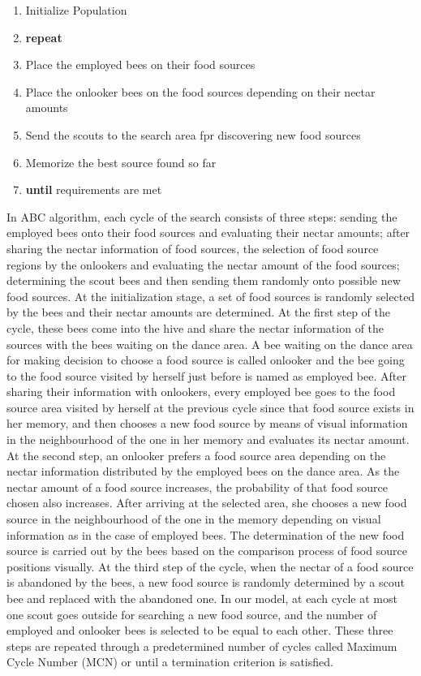 \documentclass[pdftex,11pt]{article}
\begin{document}
\begin{enumerate}
\item Initialize Population
\item \textbf{repeat}
\item Place the employed bees on their food sources
\item Place the onlooker bees on the food sources depending on their nectar amounts
\item Send the scouts to the search area fpr discovering new food sources
\item Memorize the best source found so far
\item \textbf{until} requirements are met
\end{enumerate}
In ABC algorithm, each cycle of the search consists of three steps: sending the employed bees onto their food sources and evaluating their nectar amounts; after sharing the nectar information of food sources, the selection of food source regions by the onlookers and evaluating the nectar amount of the food sources; determining the scout bees and then sending them randomly onto possible new food sources. At the initialization stage, a set of food sources is randomly selected by the bees and their nectar amounts are determined. At the first step of the cycle, these bees come into the hive and share the nectar information of the sources with the bees waiting on the dance area. A bee waiting on the dance area for making decision to choose a food source is called onlooker and the bee going to the food source visited by herself just before is named as employed bee. After sharing their information with onlookers, every employed bee goes to the food source area visited by herself at the previous cycle since that food source exists in her memory, and then chooses a new food source by means of visual information in the neighbourhood of the one in her memory and evaluates its nectar amount. At the second step, an onlooker prefers a food source area depending on the nectar information distributed by the employed bees on the dance area. As the nectar amount of a food source increases, the probability of that food source chosen also increases. After arriving at the selected area, she chooses a new food source in the neighbourhood of the one in the memory depending on visual information as in the case of employed bees. The determination of the new food source is carried out by the bees based on the comparison process of food source positions visually. At the third step of the cycle, when the nectar of a food source is abandoned by the bees, a new food source is randomly determined by a scout bee and replaced with the abandoned one. In our model, at each cycle at most one scout goes outside for searching a new food source, and the number of employed and onlooker bees is selected to be equal to each other. These three steps are repeated through a predetermined number of cycles called Maximum Cycle Number (MCN) or until a termination criterion is satisfied.
\end{document}
